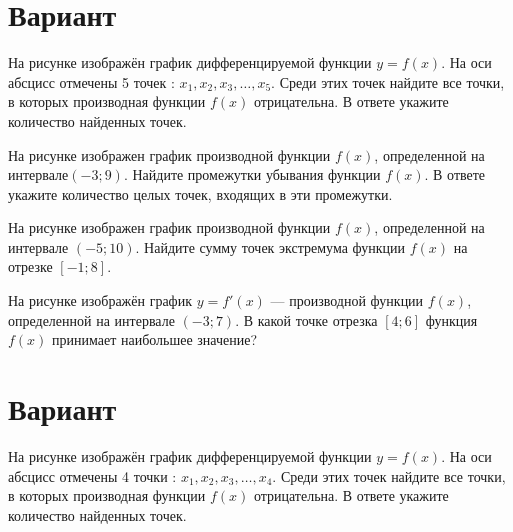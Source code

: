 \newpage\section{Вариант}\begin{taskBN}{1}
На рисунке изображён график дифференцируемой функции $y=f(x)$. На оси абсцисс отмечены 5 точек : $x_1, x_2, x_3, \dots, x_5$. Среди этих точек найдите все точки, в которых производная функции $f(x)$ отрицательна. В ответе укажите количество найденных точек.
\end{taskBN}

\begin{taskBN}{2}
На рисунке изображен график производной функции $f(x)$, определенной на интервале$(-3; 9)$. Найдите промежутки убывания функции $f(x)$. В ответе укажите количество целых точек, входящих в эти промежутки.
\end{taskBN}

\begin{taskBN}{3}
На рисунке изображен график производной функции $f(x)$, определенной на интервале $(-5;10)$. Найдите сумму точек экстремума функции $f(x)$ на отрезке $[-1;8]$.
\end{taskBN}

\begin{taskBN}{4}
На рисунке изображён график $y=f'(x)$ — производной функции $f(x)$, определенной на интервале $(-3;7)$. В какой точке отрезка $[4; 6]$ функция $f(x)$ принимает наибольшее значение?
\end{taskBN}

\newpage\section{Вариант}\begin{taskBN}{1}
На рисунке изображён график дифференцируемой функции $y=f(x)$. На оси абсцисс отмечены 4 точки : $x_1, x_2, x_3, \dots, x_4$. Среди этих точек найдите все точки, в которых производная функции $f(x)$ отрицательна. В ответе укажите количество найденных точек.
\end{taskBN}

